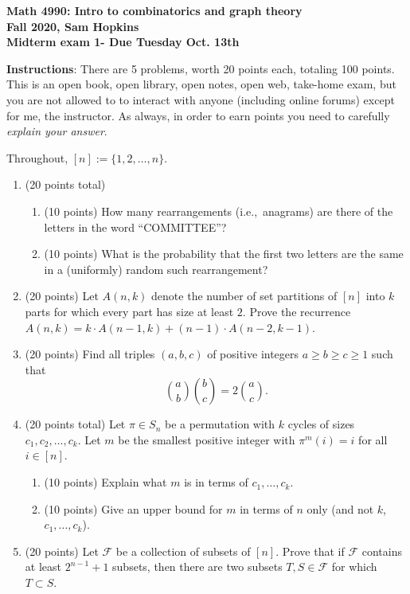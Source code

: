 \documentclass[11pt]{article}
\begin{document}
\thispagestyle{empty}

\begin{center}
{\bf Math 4990: Intro to combinatorics and graph theory \\
Fall 2020, Sam Hopkins \\
Midterm exam 1- Due Tuesday Oct. 13th}
\end{center}

{\bf Instructions}: There are 5 problems, worth 20 points each, totaling 100 points. This is an open book, open library, open notes, open web, take-home exam, but you are not allowed to to interact with anyone (including online forums) except for me, the instructor. As always, in order to earn points you need to carefully \emph{explain your answer}.

\medskip

Throughout, $[n] :=\{1,2,\ldots,n\}$.

\begin{enumerate}

\item (20 points total) \begin{enumerate}
\item (10 points) How many rearrangements (i.e.,~anagrams) are there of the letters in the word ``COMMITTEE''?
\item (10 points) What is the probability that the first two letters are the same in a (uniformly) random such rearrangement?
\end{enumerate}

\item (20 points) Let $A(n,k)$ denote the number of set partitions of $[n]$ into $k$ parts for which every part has size at least $2$. Prove the recurrence $A(n,k) = k\cdot A(n-1,k) + (n-1)\cdot A(n-2,k-1)$.

\item (20 points) Find all triples $(a,b,c)$ of positive integers $a \geq b \geq c \geq 1$ such that
\[\binom{a}{b}\binom{b}{c} = 2\binom{a}{c}.\]

\item (20 points total) Let $\pi \in S_n$ be a permutation with $k$ cycles of sizes $c_1,c_2,\ldots, c_k$. Let $m$ be the smallest positive integer with $\pi^m(i)=i$ for all $i \in [n]$. \begin{enumerate}
\item (10 points) Explain what $m$ is in terms of $c_1,\ldots,c_k$.
\item (10 points) Give an upper bound for $m$ in terms of $n$ only (and not $k$, $c_1,\ldots,c_k$).
\end{enumerate} 

\item (20 points) Let $\mathcal{F}$ be a collection of subsets of $[n]$. Prove that if $\mathcal{F}$ contains at least $2^{n-1}+1$ subsets, then there are two subsets $T,S \in \mathcal{F}$ for which $T\subset S$.

\end{enumerate}
\end{document}
